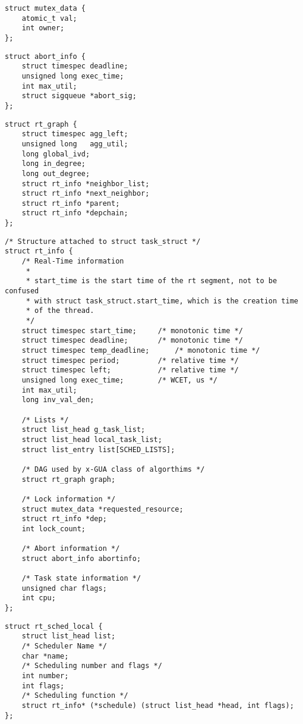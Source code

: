 \documentclass[12pt,dvips]{report}
\begin{document}
\begin{lstlisting}[caption= Data structure used to define locks, label=code:mutex-data]
struct mutex_data {
	atomic_t val;
	int owner;
};
\end{lstlisting}

\begin{lstlisting}[caption=Data structure used for abort handlers, label=code:abort]
struct abort_info {
	struct timespec deadline;
	unsigned long exec_time;
	int max_util;
	struct sigqueue *abort_sig;
};
\end{lstlisting}

\begin{lstlisting}[caption=Data structure for the DAG representation of the dependency chain, label=code:dag]
struct rt_graph {
	struct timespec agg_left;
	unsigned long 	agg_util;
	long global_ivd;
	long in_degree;
	long out_degree;
	struct rt_info *neighbor_list;
	struct rt_info *next_neighbor;
	struct rt_info *parent;
	struct rt_info *depchain;
};
\end{lstlisting}

\begin{lstlisting}[caption=The ChronOS main real-time data structure, label=code:rtinfo]
/* Structure attached to struct task_struct */
struct rt_info {
	/* Real-Time information 
	 * 
	 * start_time is the start time of the rt segment, not to be confused
	 * with struct task_struct.start_time, which is the creation time
	 * of the thread.
	 */
	struct timespec start_time;		/* monotonic time */
	struct timespec deadline;		/* monotonic time */
	struct timespec temp_deadline;		/* monotonic time */
	struct timespec period;			/* relative time */
	struct timespec left;			/* relative time */
	unsigned long exec_time;		/* WCET, us */
	int max_util;
	long inv_val_den;

	/* Lists */
	struct list_head g_task_list;
	struct list_head local_task_list;
	struct list_entry list[SCHED_LISTS];

	/* DAG used by x-GUA class of algorthims */
	struct rt_graph graph;	

	/* Lock information */
	struct mutex_data *requested_resource;
	struct rt_info *dep;
	int lock_count;

	/* Abort information */
	struct abort_info abortinfo;

	/* Task state information */
	unsigned char flags;
	int cpu;
};
\end{lstlisting}

\pagebreak

\begin{lstlisting}[caption=Scheduler plugin for single-processor schedulers, label=code:localplug]
struct rt_sched_local {
	struct list_head list;
	/* Scheduler Name */
	char *name;
	/* Scheduling number and flags */
	int number;
	int flags;
	/* Scheduling function */
	struct rt_info* (*schedule) (struct list_head *head, int flags);
};
\end{lstlisting}
\end{document}
